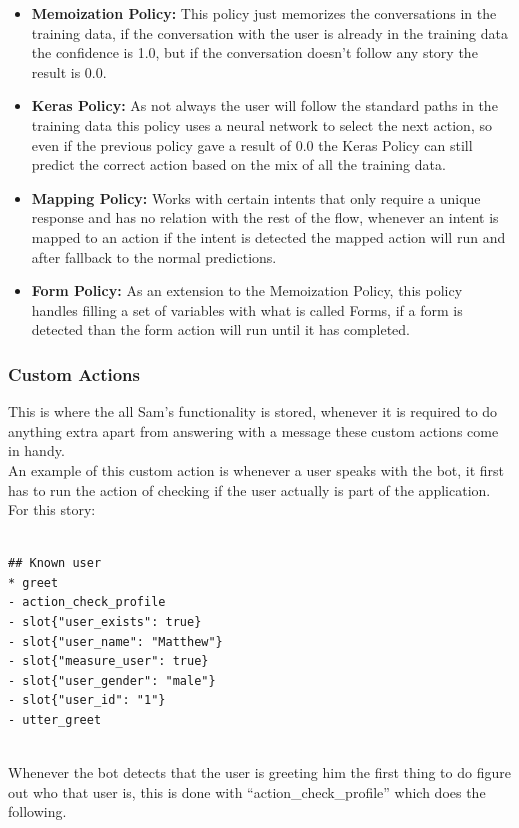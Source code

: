 \begin{itemize}
	\item {\textbf{Memoization Policy:} This policy just memorizes the conversations in the training data, if the conversation with the user is already in the training data the confidence is 1.0, but if the conversation doesn’t follow any story the result is 0.0.}
	\item {\textbf{Keras Policy:} As not always the user will follow the standard paths in the training data this policy uses a neural network to select the next action, so even if the previous policy gave a result of 0.0 the Keras Policy can still predict the correct action based on the mix of all the training data.}
	\item {\textbf{Mapping Policy:} Works with certain intents that only require a unique response and has no relation with the rest of the flow, whenever an intent is mapped to an action if the intent is detected the mapped action will run and after fallback to the normal predictions.}
	\item {\textbf{Form Policy:} As an extension to the Memoization Policy, this policy handles filling a set of variables with what is called Forms, if a form is detected than the form action will run until it has completed.}
\end{itemize}

\subsubsection{Custom Actions}\label{sec:chap4_cust_act}

This is where the all Sam’s functionality is stored, whenever it is required to do anything extra apart from answering with a message these custom actions come in handy.\\
An example of this custom action is whenever a user speaks with the bot, it first has to run the action of checking if the user actually is part of the application.\\
For this story:

\begin{lstlisting}

## Known user
* greet
- action_check_profile
- slot{"user_exists": true}
- slot{"user_name": "Matthew"}
- slot{"measure_user": true}
- slot{"user_gender": "male"}
- slot{"user_id": "1"}
- utter_greet


\end{lstlisting}

Whenever the bot detects that the user is greeting him the first thing to do figure out who that user is, this is done with “action\_check\_profile” which does the following.

